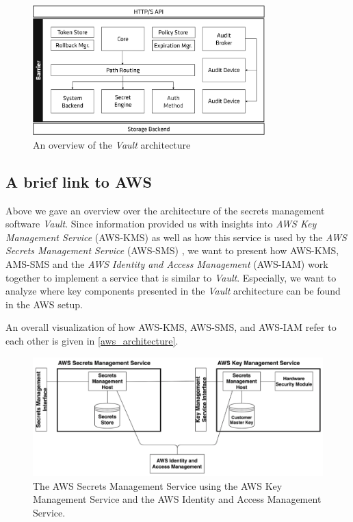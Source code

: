 \documentclass[runningheads]{llncs}
\begin{document}
\begin{figure}
    \centering
    \includegraphics[width=0.8\textwidth]{images/vault_architecture.png}
    \caption{An overview of the \textit{Vault} architecture}
    \label{vault_architecture}
\end{figure}

\newpage

\subsection{A brief link to AWS}
Above we gave an overview over the architecture of the secrets management software \textit{Vault}. Since information provided us with insights into \textit{AWS Key Management Service} (AWS-KMS) \cite{aws-kms} as well as how this service is used by the \textit{AWS Secrets Management Service} (AWS-SMS) \cite{aws-sms}, we want to present how AWS-KMS, AMS-SMS and the \textit{AWS Identity and Access Management} (AWS-IAM) work together to implement a service that is similar to \textit{Vault}. Especially, we want to analyze where key components presented in the \textit{Vault} architecture can be found in the AWS setup.

An overall visualization of how AWS-KMS, AWS-SMS, and AWS-IAM refer to each other is given in \autoref{aws_architecture}. 

\begin{figure}
    \centering
    \includegraphics[width=\textwidth]{images/aws.png}
    \caption{The AWS Secrets Management Service using the AWS Key Management Service and the AWS Identity and Access Management Service.}
    \label{aws_architecture}
\end{figure}
\end{document}
